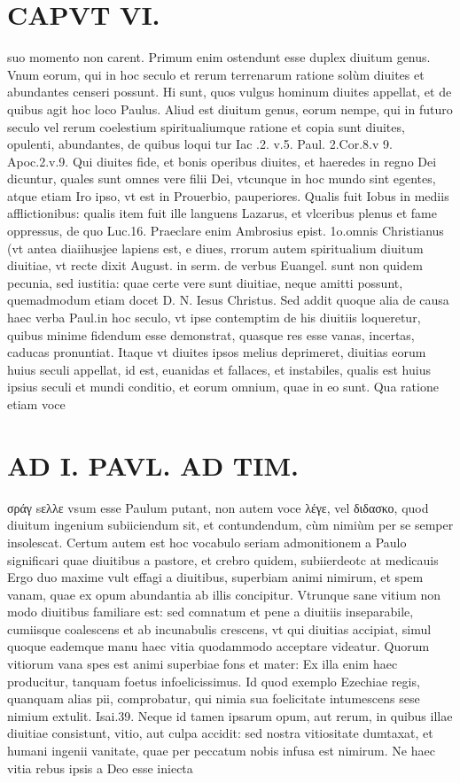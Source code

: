 \documentclass{article}
\begin{document}
\begin{pages}
\section*{CAPVT  VI. }
\marginpar{[ p.495 ]}\pstart suo momento non carent. Primum enim ostendunt esse duplex diuitum genus. Vnum eorum, qui in hoc seculo et rerum terrenarum ratione solùm diuites et abundantes censeri possunt. Hi sunt, quos vulgus hominum diuites appellat, et de quibus agit hoc loco Paulus. Aliud est diuitum genus, eorum nempe, qui in futuro seculo vel rerum coelestium spiritualiumque  ratione et copia sunt diuites, opulenti, abundantes, de quibus loqui tur Iac .2. v.5. Paul. 2.Cor.8.v 9. Apoc.2.v.9. Qui diuites fide, et bonis operibus diuites, et haeredes in regno Dei dicuntur, quales sunt omnes vere filii Dei, vtcunque in hoc mundo sint egentes, atque etiam Iro ipso, vt est in Prouerbio, pauperiores. Qualis fuit Iobus in mediis afflictionibus: qualis item fuit ille languens Lazarus, et vlceribus plenus et fame oppressus, de quo Luc.16. Praeclare enim Ambrosius epist. 1o.omnis Christianus (vt antea diaiihusjee lapiens est, e diues, rrorum autem spiritualium diuitum diuitiae, vt recte dixit August. in serm. de verbus  Euangel. sunt non quidem pecunia, sed iustitia: quae certe vere sunt diuitiae, neque amitti possunt, quemadmodum etiam docet D. N. Iesus Christus.  \pend\pstart Sed addit quoque alia de causa haec verba Paul.in hoc seculo, vt ipse contemptim de his diuitiis loqueretur, quibus minime fidendum esse demonstrat, quasque res esse vanas, incertas, caducas pronuntiat. Itaque vt diuites ipsos melius deprimeret, diuitias eorum huius seculi appellat, id est, euanidas et fallaces, et instabiles, qualis est huius ipsius seculi et mundi conditio, et eorum omnium, quae in eo sunt. Qua ratione etiam voce  \pend
\section*{AD I. PAVL. AD TIM. }
\marginpar{[ p.490 ]}\pstart σράγ sελλε vsum esse Paulum putant, non autem voce λέγε, vel διδασκο, quod diuitum ingenium subiiciendum sit, et contundendum, cùm nimiùm per se semper insolescat. Certum autem est hoc vocabulo seriam admonitionem a Paulo significari quae diuitibus a pastore, et crebro quidem, subiierdeotc at medicauis  \pend\pstart Ergo duo maxime vult effagi a diuitibus, superbiam animi nimirum, et spem vanam, quae ex opum abundantia ab illis concipitur. Vtrunque sane vitium non modo diuitibus familiare est: sed comnatum et pene a diuitiis inseparabile, cumiisque coalescens et ab incunabulis crescens, vt qui diuitias accipiat, simul quoque eademque  manu haec vitia quodammodo acceptare videatur. Quorum vitiorum vana spes est animi superbiae fons et mater: Ex illa enim haec producitur, tanquam foetus infoelicissimus. Id quod exemplo Ezechiae regis, quanquam alias pii, comprobatur, qui nimia sua foelicitate intumescens sese nimium extulit. Isai.39. Neque id tamen ipsarum opum, aut rerum, in quibus illae diuitiae consistunt, vitio, aut culpa accidit: sed nostra vitiositate dumtaxat, et humani ingenii vanitate, quae per peccatum nobis infusa est nimirum.  \pend\pstart Ne haec vitia rebus ipsis a Deo esse iniecta  \pend

\end{pages}
\end{document}
